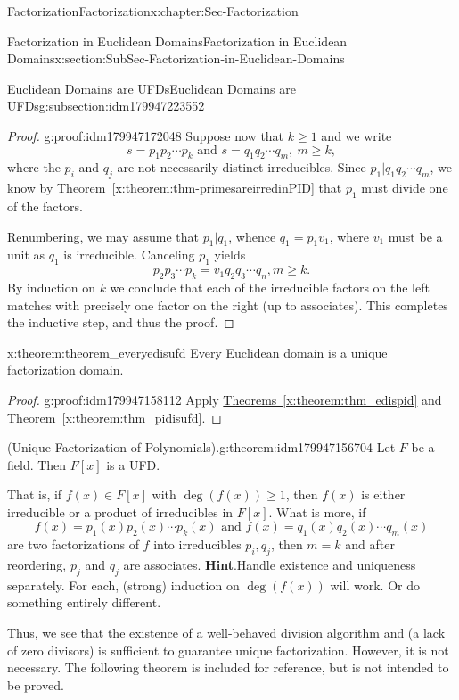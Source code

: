 \documentclass[oneside,10pt,]{book}
\newcommand{\blocktitlefont}{\relax}
\newcommand{\xreffont}{\relax}
\numberwithin{equation}{section}
\renewcommand{\ge}{\geqslant}
\begin{document}
\begin{chapterptx}{Factorization}{}{Factorization}{}{}{x:chapter:Sec-Factorization}
\begin{sectionptx}{Factorization in Euclidean Domains}{}{Factorization in Euclidean Domains}{}{}{x:section:SubSec-Factorization-in-Euclidean-Domains}
\begin{subsectionptx}{Euclidean Domains are UFDs}{}{Euclidean Domains are UFDs}{}{}{g:subsection:idm179947223552}
\begin{proof}{}{g:proof:idm179947172048}
Suppose now that \(k\ge 1\) and we write%
\begin{equation*}
s = p_1 p_2 \cdots p_k \text{ and }  s = q_1 q_2 \cdots q_m, \ m \ge k,
\end{equation*}
where the \(p_i\) and \(q_j\) are not necessarily distinct irreducibles. Since \(p_1 | q_1 q_2 \cdots q_m\), we know by \hyperref[x:theorem:thm-primesareirredinPID]{Theorem~{\xreffont\ref{x:theorem:thm-primesareirredinPID}}} that \(p_1\) must divide one of the factors.%
\par
Renumbering, we may assume that \(p_1 | q_1\), whence \(q_1 = p_1 v_1\), where \(v_1\) must be a unit as \(q_1\) is irreducible. Canceling \(p_1\) yields%
\begin{equation*}
p_2 p_3 \cdots p_k = v_1 q_2 q_3 \cdots q_n, m\ge k.
\end{equation*}
By induction on \(k\) we conclude that each of the irreducible factors on the left matches with precisely one factor on the right (up to associates). This completes the inductive step, and thus the proof.%
\end{proof}
\begin{theorem}{}{}{x:theorem:theorem_everyedisufd}%
Every Euclidean domain is a unique factorization domain.%
\end{theorem}
\begin{proof}{}{g:proof:idm179947158112}
Apply \hyperref[x:theorem:thm_edispid]{Theorems~{\xreffont\ref{x:theorem:thm_edispid}}} and \hyperref[x:theorem:thm_pidisufd]{Theorem~{\xreffont\ref{x:theorem:thm_pidisufd}}}.%
\end{proof}
\begin{theorem}{(Unique Factorization of Polynomials).}{}{g:theorem:idm179947156704}%
Let \(F\) be a field. Then \(F[x]\) is a UFD.%
\par
That is, if \(f(x) \in F[x]\) with \(\deg(f(x)) \ge 1\), then \(f(x)\) is either irreducible or a product of irreducibles in \(F[x]\). What is more, if%
\begin{equation*}
f(x) = p_1(x) p_2(x) \cdots p_k(x) \text{ and }  f(x) = q_1(x) q_2(x) \cdots q_m(x)
\end{equation*}
are two factorizations of \(f\) into irreducibles \(p_i, q_j\), then \(m=k\) and after reordering, \(p_j\) and \(q_j\) are associates.%
\textbf{\blocktitlefont Hint}.\quad{}Handle existence and uniqueness separately. For each, (strong) induction on \(\deg(f(x))\) will work. Or do something entirely different.%
\end{theorem}
Thus, we see that the existence of a well-behaved division algorithm and (a lack of zero divisors) is sufficient to guarantee unique factorization. However, it is not necessary. The following theorem is included for reference, but is not intended to be proved.%

\end{subsectionptx}
\end{sectionptx}
\end{chapterptx}
\end{document}
